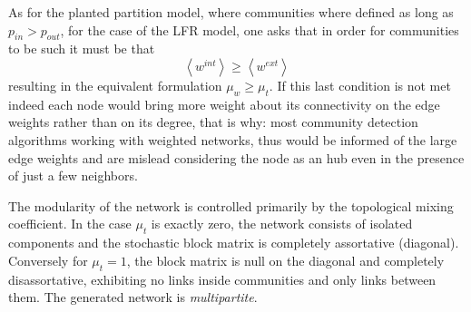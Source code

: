 As for the planted partition model, where communities where defined as long as $p_{in}>p_{out}$, for the case of the LFR model, one asks that in order for communities to be such it must be that
\begin{equation}
\left< w^{int} \right> \geq \left< w^{ext} \right>
\end{equation}
resulting in the equivalent formulation $\mu_w  \geq \mu_t$. If this last condition is not met indeed each node would bring more weight about its connectivity on the edge weights rather than on its degree, that is why: most community detection algorithms working with weighted networks, thus would be informed of the large edge weights and are mislead considering the node as an hub even in the presence of just a few neighbors.

The modularity of the network is controlled primarily by the topological mixing coefficient. In the case $\mu_t$ is exactly zero, the network consists of isolated components and the stochastic block matrix is completely assortative (diagonal). Conversely for $\mu_t=1$, the block matrix is null on the diagonal and completely disassortative, exhibiting no links inside communities and only links between them. The generated network is \emph{multipartite}.

